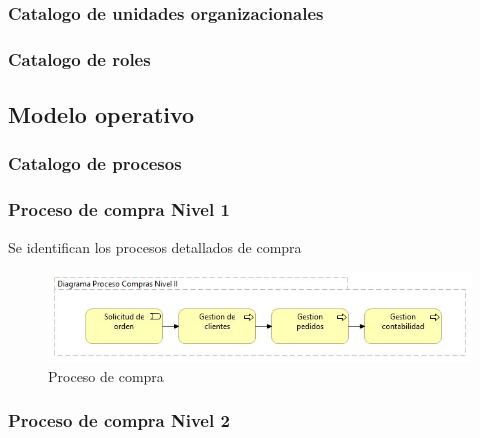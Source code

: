 \documentclass[12pt]{article}
\begin{document}
\subsubsection{Catalogo de unidades organizacionales }
\subsubsection{Catalogo de roles}




\subsection{Modelo operativo}
\subsubsection{Catalogo de procesos}




\subsubsection{Proceso de compra Nivel 1}
Se identifican los procesos detallados de compra


\begin{figure}[ht]
\centering
\centering
\includegraphics[scale=0.6]{pc2.jpeg}
\caption{Proceso de compra}
\label{2}
\end{figure}
\FloatBarrier




\subsubsection{Proceso de compra Nivel 2}
\end{document}
